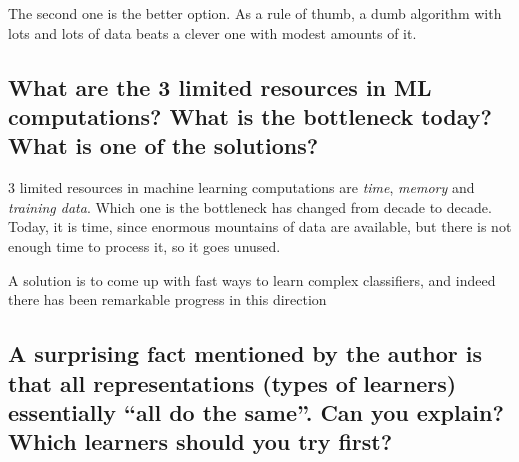 \documentclass[12pt]{article}
\begin{document}
The second one is the better option. As a rule of thumb, a dumb algorithm with
lots and lots of data beats a clever one with modest amounts of it.

\subsection{What are the 3 limited resources in ML computations? What is the
bottleneck today? What is one of the solutions?}

3 limited resources in machine learning computations are \emph{time},
\emph{memory} and \emph{training data}. Which one is the bottleneck has changed
from decade to decade. Today, it is time, since enormous mountains of data are
available, but there is not enough time to process it, so it goes unused.

A solution is to come up with fast ways to learn complex classifiers, and
indeed there has been remarkable progress in this direction

\subsection{A surprising fact mentioned by the author is that all
representations (types of learners) essentially ``all do the same''. Can you
explain? Which learners should you try first?}



{}

\end{document}
